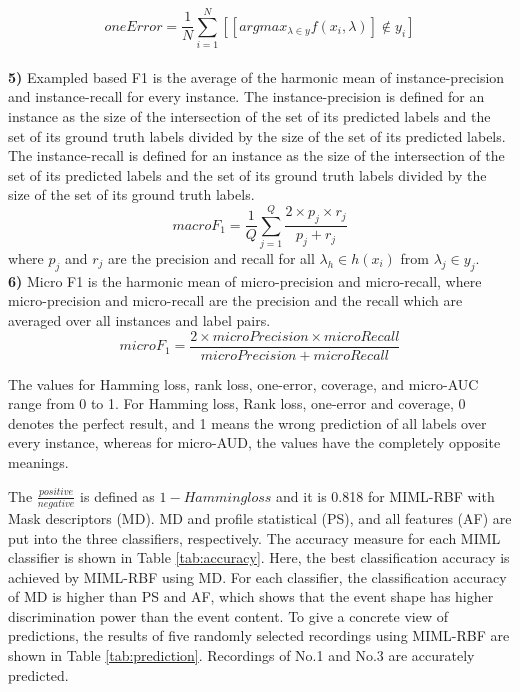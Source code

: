 \begin{equation}
oneError = \frac{1}{N}\sum_{i=1}^{N}[[argmax_{\lambda \in y} f(x_{i},\lambda)] \not \in y_{i} ]
\end{equation}
\\
\textbf{5)}
Exampled based F1 is the average of the harmonic mean of instance-precision and instance-recall for every instance. The instance-precision is defined for an instance as the size of the intersection of the set of its predicted labels and the set of its ground truth labels divided by the size of the set of its predicted labels. The instance-recall is defined for an instance as the size of the intersection of the set of its predicted labels and the set of its ground truth labels divided by the size of the set of its ground truth labels.
\begin{equation}
macroF_{1}=\frac{1}{Q}\sum_{j=1}^{Q}\frac{2 \times p_{j} \times r_{j}}{p_{j}+r_{j}}
\end{equation}
where $p_{j}$ and $r_{j}$ are the precision and recall for all $\lambda_{h} \in h(x_{i})$ from $\lambda_{j} \in y_{j}$.
\\
\textbf{6)}
Micro F1 is the harmonic mean of micro-precision and micro-recall, where micro-precision and micro-recall are the precision and the recall which are averaged over all instances and label pairs. 
\begin{equation}
microF_{1} = \frac{2 \times microPrecision \times microRecall}{microPrecision + microRecall}
\end{equation}

The values for Hamming loss, rank loss, one-error, coverage, and micro-AUC range from 0 to 1. For Hamming loss, Rank loss, one-error and coverage, 0 denotes the perfect result, and 1 means the wrong prediction of all labels over every instance, whereas for micro-AUD, the values
have the completely opposite meanings. 

The $\frac{positive}{negative}$ is defined as $1-Hamming loss$ and it is 0.818 for MIML-RBF with Mask descriptors (MD). MD and profile statistical (PS), and all features (AF) are put into the three classifiers, respectively. The accuracy measure for each MIML classifier is shown in Table \ref{tab:accuracy}. Here, the best classification accuracy is achieved by MIML-RBF using MD. For each classifier, the classification accuracy of MD is higher than PS and AF, which shows that the event shape has higher discrimination power than the event content. To give a concrete view of predictions, the results of five randomly selected recordings using MIML-RBF are shown in Table \ref{tab:prediction}. Recordings of No.1 and No.3 are accurately predicted. 




